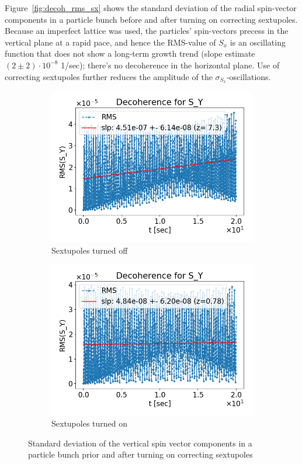 \documentclass[a4paper]{jacow}
\begin{document}
Figure~\ref{fig:decoh_rms_sx} shows the standard deviation of the radial spin-vector components in a particle bunch before and after turning on correcting sextupoles. Because an imperfect lattice was used, the particles' spin-vectors precess in the vertical plane at a rapid pace, and hence the RMS-value of $S_x$ is an oscillating function that does not show a long-term growth trend (slope estimate $(2 \pm 2)\cdot 10^{-8}$ 1/sec); there's no decoherence in the horizontal plane. Use of correcting sextupoles further reduces the amplitude of the $\sigma_{S_x}$-oscillations.

\begin{figure}[h!]
  \centering
  \begin{subfigure}{\linewidth}
    \centering
    \includegraphics[width=\linewidth]{../img/IPAC19/SY_decoh_20sec_unopt}
    \caption{Sextupoles turned off\label{fig:decoh_rms_sy_unopt}}
  \end{subfigure}
  \begin{subfigure}{\linewidth}
    \centering
    \includegraphics[width=\linewidth]{../img/IPAC19/SY_decoh_20sec_opt}
    \caption{Sextupoles turned on\label{fig:decoh_rms_sy_opt}}
  \end{subfigure}
  \caption{Standard deviation of the vertical spin vector components in a particle bunch
    prior and after turning on correcting sextupoles\label{fig:decoh_rms_sy}}
\end{figure}
\end{document}

